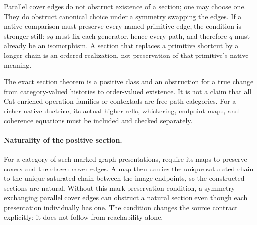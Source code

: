 \documentclass[11pt]{article}
\theoremstyle{definition}
\theoremstyle{remark}
\begin{document}
Parallel cover edges do not obstruct existence of a section; one may
choose one. They do obstruct canonical choice under a symmetry swapping
the edges. If a native comparison must preserve every named primitive
edge, the condition is stronger still: $s q$ must fix each generator,
hence every path, and therefore $q$ must already be an isomorphism.
A section that replaces a primitive shortcut by a longer chain is an
ordered realization, not preservation of that primitive's native meaning.

The exact section theorem is a positive class and an obstruction for a
true change from category-valued histories to order-valued existence.
It is not a claim that all Cat-enriched operation families or contextads
are free path categories. For a richer native doctrine, its actual
higher cells, whiskering, endpoint maps, and coherence equations must be
included and checked separately.


\paragraph{Naturality of the positive section.}
For a category of such marked graph presentations, require its maps to
preserve covers and the chosen cover edges. A map then carries the unique
saturated chain to the unique saturated chain between the image endpoints,
so the constructed sections are natural. Without this mark-preservation
condition, a symmetry exchanging parallel cover edges can obstruct a
natural section even though each presentation individually has one. The
condition changes the source contract explicitly; it does not follow from
reachability alone.
\end{document}
